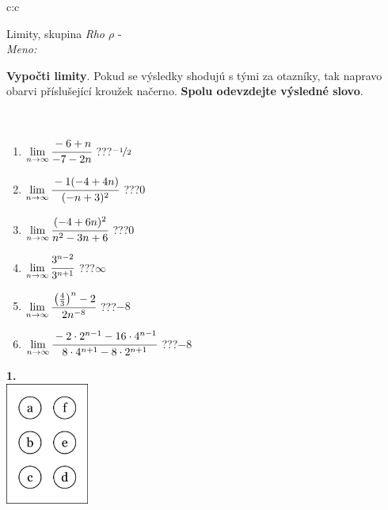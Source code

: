 \documentclass[10pt]{report}
\begin{document}
\begin{tabular}{c:c}
\begin{minipage}[c][104.5mm][t]{0.5\linewidth}
\begin{center}
\vspace{7mm}
{\huge Limity, skupina \textit{Rho $\rho$} -}\\[5mm]
\textit{Meno:}\phantom{xxxxxxxxxxxxxxxxxxxxxxxxxxxxxxxxxxxxxxxxxxxxxxxxxxxxxxxxxxxxxxxxx}\\[5mm]
\begin{minipage}{0.95\linewidth}
\begin{center}
\textbf{Vypočti limity}. Pokud se výsledky shodujú s tými za otazníky, tak napravo\\obarvi příslušející kroužek načerno. \textbf{Spolu odevzdejte výsledné slovo}.
\end{center}
\end{minipage}
\\[1mm]
\begin{minipage}{0.79\linewidth}
\begin{center}
\begin{varwidth}{\linewidth}
\begin{enumerate}
\normalsize
\item $\lim\limits_{n\to\infty}\cfrac{-6+n}{-7-2n}$\quad \dotfill\; ???\;\dotfill \quad $\nicefrac{-1}{2}$
\item $\lim\limits_{n\to\infty}\cfrac{-1(-4+4n)}{(-n+3)^2}$\quad \dotfill\; ???\;\dotfill \quad $0$
\item $\lim\limits_{n\to\infty}\cfrac{(-4+6n)^2}{n^2-3n+6}$\quad \dotfill\; ???\;\dotfill \quad $0$
\item $\lim\limits_{n\to\infty}\cfrac{3^{n-2}}{3^{n+1}}$\quad \dotfill\; ???\;\dotfill \quad $\infty$
\item $\lim\limits_{n\to\infty}\cfrac{\left(\frac{4}{3}\right)^n -2}{2n^{-8}}$\quad \dotfill\; ???\;\dotfill \quad $-8$
\item $\lim\limits_{n\to\infty}\cfrac{-2\cdot 2^{n-1}-16\cdot 4^{n-1}}{8\cdot 4^{n+1}-8\cdot 2^{n+1}}$\quad \dotfill\; ???\;\dotfill \quad $-8$
\end{enumerate}
\end{varwidth}
\end{center}
\end{minipage}
\begin{minipage}{0.20\linewidth}
\begin{center}
{\Huge\bfseries 1.} \\[2mm]
\includegraphics[height=40mm]{../images/braille.png}

\end{center}
\end{minipage}
\end{center}
\end{minipage}
\end{tabular}
\end{document}
